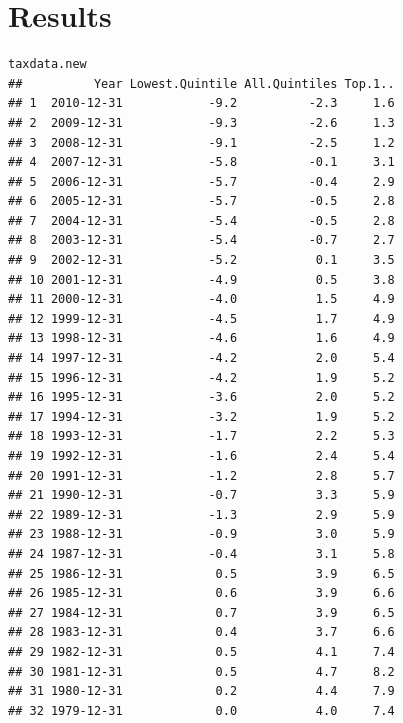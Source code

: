\documentclass{article}\usepackage[]{graphicx}\usepackage[]{color}
\makeatletter
\newenvironment{kframe}{%
 \def\at@end@of@kframe{}%
 \ifinner\ifhmode%
  \def\at@end@of@kframe{\end{minipage}}%
  \begin{minipage}{\columnwidth}%
 \fi\fi%
 \def\FrameCommand##1{\hskip\@totalleftmargin \hskip-\fboxsep
 \colorbox{shadecolor}{##1}\hskip-\fboxsep
     \hskip-\linewidth \hskip-\@totalleftmargin \hskip\columnwidth}%
 \MakeFramed {\advance\hsize-\width
   \@totalleftmargin\z@ \linewidth\hsize
   \@setminipage}}%
 {\par\unskip\endMakeFramed%
 \at@end@of@kframe}
\newenvironment{knitrout}{}{} %
\makeatother
\begin{document}
\section{Results}

\begin{table}

\begin{knitrout}
\color{fgcolor}\begin{kframe}
\begin{verbatim}
taxdata.new
##          Year Lowest.Quintile All.Quintiles Top.1..
## 1  2010-12-31            -9.2          -2.3     1.6
## 2  2009-12-31            -9.3          -2.6     1.3
## 3  2008-12-31            -9.1          -2.5     1.2
## 4  2007-12-31            -5.8          -0.1     3.1
## 5  2006-12-31            -5.7          -0.4     2.9
## 6  2005-12-31            -5.7          -0.5     2.8
## 7  2004-12-31            -5.4          -0.5     2.8
## 8  2003-12-31            -5.4          -0.7     2.7
## 9  2002-12-31            -5.2           0.1     3.5
## 10 2001-12-31            -4.9           0.5     3.8
## 11 2000-12-31            -4.0           1.5     4.9
## 12 1999-12-31            -4.5           1.7     4.9
## 13 1998-12-31            -4.6           1.6     4.9
## 14 1997-12-31            -4.2           2.0     5.4
## 15 1996-12-31            -4.2           1.9     5.2
## 16 1995-12-31            -3.6           2.0     5.2
## 17 1994-12-31            -3.2           1.9     5.2
## 18 1993-12-31            -1.7           2.2     5.3
## 19 1992-12-31            -1.6           2.4     5.4
## 20 1991-12-31            -1.2           2.8     5.7
## 21 1990-12-31            -0.7           3.3     5.9
## 22 1989-12-31            -1.3           2.9     5.9
## 23 1988-12-31            -0.9           3.0     5.9
## 24 1987-12-31            -0.4           3.1     5.8
## 25 1986-12-31             0.5           3.9     6.5
## 26 1985-12-31             0.6           3.9     6.6
## 27 1984-12-31             0.7           3.9     6.5
## 28 1983-12-31             0.4           3.7     6.6
## 29 1982-12-31             0.5           4.1     7.4
## 30 1981-12-31             0.5           4.7     8.2
## 31 1980-12-31             0.2           4.4     7.9
## 32 1979-12-31             0.0           4.0     7.4
\end{verbatim}
\end{kframe}
\end{knitrout}
\caption{Change in Federal Tax Rates}
\label{table:table1}
\end{table}
\end{document}
